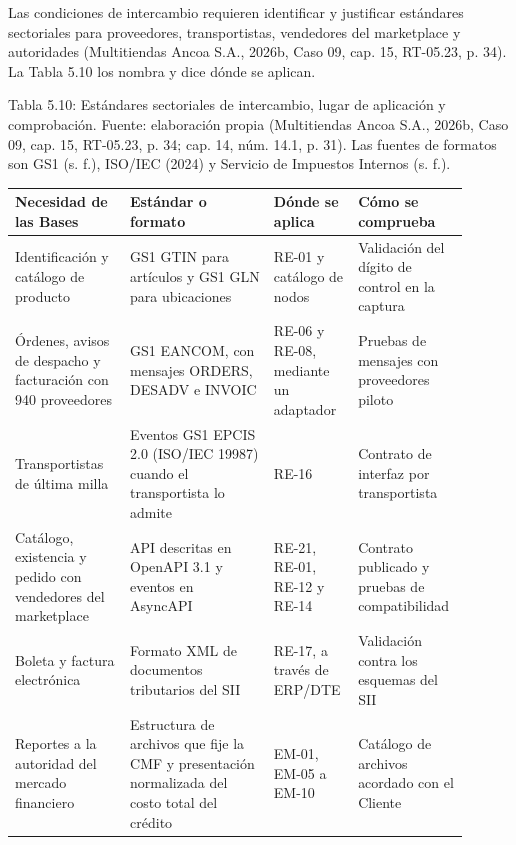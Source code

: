 \documentclass[11pt]{article}
\begin{document}
Las condiciones de intercambio requieren identificar y justificar estándares sectoriales para proveedores, transportistas, vendedores del marketplace y autoridades (Multitiendas Ancoa S.A., 2026b, Caso 09, cap. 15, RT-05.23, p. 34). La Tabla 5.10 los nombra y dice dónde se aplican.

\par\vspace{0.6\baselineskip}\noindent\begin{minipage}{\linewidth}
Tabla 5.10: Estándares sectoriales de intercambio, lugar de aplicación y comprobación. Fuente: elaboración propia (Multitiendas Ancoa S.A., 2026b, Caso 09, cap. 15, RT-05.23, p. 34; cap. 14, núm. 14.1, p. 31). Las fuentes de formatos son GS1 (s. f.), ISO/IEC (2024) y Servicio de Impuestos Internos (s. f.).\label{tab:t15}\par\vspace{0.3\baselineskip}
\begin{tabular}{@{}p{0.248\linewidth}p{0.300\linewidth}p{0.142\linewidth}p{0.212\linewidth}@{}}
\toprule Necesidad de las Bases & Estándar o formato & Dónde se aplica & Cómo se comprueba \\
\midrule
Identificación y catálogo de producto & GS1 GTIN para artículos y GS1 GLN para ubicaciones & RE-01 y catálogo de nodos & Validación del dígito de control en la captura \\
Órdenes, avisos de despacho y facturación con 940 proveedores & GS1 EANCOM, con mensajes ORDERS, DESADV e INVOIC & RE-06 y RE-08, mediante un adaptador & Pruebas de mensajes con proveedores piloto \\
Transportistas de última milla & Eventos GS1 EPCIS 2.0 (ISO/IEC 19987) cuando el transportista lo admite & RE-16 & Contrato de interfaz por transportista \\
Catálogo, existencia y pedido con vendedores del marketplace & API descritas en OpenAPI 3.1 y eventos en AsyncAPI & RE-21, RE-01, RE-12 y RE-14 & Contrato publicado y pruebas de compatibilidad \\
Boleta y factura electrónica & Formato XML de documentos tributarios del SII & RE-17, a través de ERP/DTE & Validación contra los esquemas del SII \\
Reportes a la autoridad del mercado financiero & Estructura de archivos que fije la CMF y presentación normalizada del costo total del crédito & EM-01, EM-05 a EM-10 & Catálogo de archivos acordado con el Cliente \\
\bottomrule
\end{tabular}
\end{minipage}
\par
\end{document}

